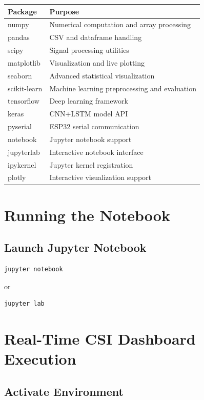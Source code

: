 \documentclass[12pt,a4paper]{article}
\begin{document}
\begin{longtable}{|p{5cm}|p{8cm}|}
\hline
\textbf{Package} & \textbf{Purpose} \\
\hline
numpy & Numerical computation and array processing \\
\hline
pandas & CSV and dataframe handling \\
\hline
scipy & Signal processing utilities \\
\hline
matplotlib & Visualization and live plotting \\
\hline
seaborn & Advanced statistical visualization \\
\hline
scikit-learn & Machine learning preprocessing and evaluation \\
\hline
tensorflow & Deep learning framework \\
\hline
keras & CNN+LSTM model API \\
\hline
pyserial & ESP32 serial communication \\
\hline
notebook & Jupyter notebook support \\
\hline
jupyterlab & Interactive notebook interface \\
\hline
ipykernel & Jupyter kernel registration \\
\hline
plotly & Interactive visualization support \\
\hline
\end{longtable}

\section{Running the Notebook}

\subsection{Launch Jupyter Notebook}

\begin{lstlisting}[language=bash]
jupyter notebook
\end{lstlisting}

or

\begin{lstlisting}[language=bash]
jupyter lab
\end{lstlisting}

\section{Real-Time CSI Dashboard Execution}

\subsection{Activate Environment}
\end{document}
